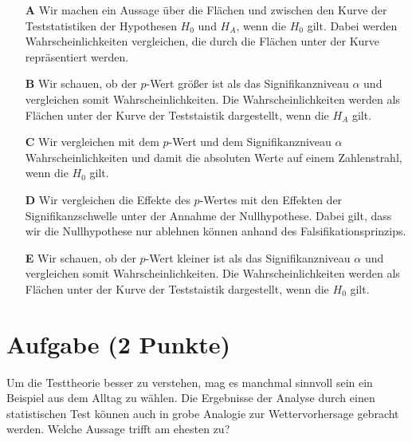 \documentclass[a4paper, 9pt]{scrartcl}\usepackage[]{graphicx}\usepackage[]{xcolor}
\begin{document}
\begin{enumerate}
\item [\textbf{A} \msquare] Wir machen ein Aussage über die Flächen und zwischen den Kurve der Teststatistiken der Hypothesen $H_0$ und $H_A$, wenn die $H_0$ gilt. Dabei werden Wahrscheinlichkeiten vergleichen, die durch die Flächen unter der Kurve repräsentiert werden.
\item [\textbf{B} \msquare] Wir schauen, ob der $p$-Wert größer ist als das Signifikanzniveau $\alpha$ und vergleichen somit Wahrscheinlichkeiten. Die Wahrscheinlichkeiten werden als Flächen unter der Kurve der Teststaistik dargestellt, wenn die $H_A$ gilt.
\item [\textbf{C} \msquare] Wir vergleichen mit dem $p$-Wert und dem Signifikanzniveau $\alpha$ Wahrscheinlichkeiten und damit die absoluten Werte auf einem Zahlenstrahl, wenn die $H_0$ gilt.
\item [\textbf{D} \msquare] Wir vergleichen die Effekte des $p$-Wertes mit den Effekten der Signifikanzschwelle unter der Annahme der Nullhypothese. Dabei gilt, dass wir die Nullhypothese nur ablehnen können anhand des Falsifikationsprinzips.
\item [\textbf{E} \msquare] Wir schauen, ob der $p$-Wert kleiner ist als das Signifikanzniveau $\alpha$ und vergleichen somit Wahrscheinlichkeiten. Die Wahrscheinlichkeiten werden als Flächen unter der Kurve der Teststaistik dargestellt, wenn die $H_0$ gilt.
\end{enumerate}

\section{Aufgabe \hfill (2 Punkte)}



Um die Testtheorie besser zu verstehen, mag es manchmal sinnvoll sein ein Beispiel aus dem Alltag zu wählen. Die Ergebnisse der Analyse durch einen statistischen Test können auch in grobe Analogie zur Wettervorhersage gebracht werden. Welche Aussage trifft am ehesten zu?
\end{document}
